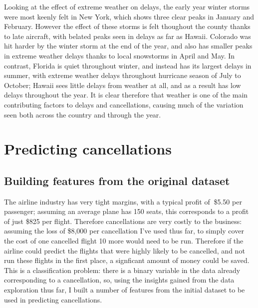 \documentclass[a4paper]{article}
\begin{document}
Looking at the effect of extreme weather on delays, the early year winter storms were most keenly felt in New York, which shows three clear peaks in January and February. However the effect of these storms is felt thoughout the county thanks to late aircraft, with belated peaks seen in delays as far as Hawaii. Colorado was hit harder by the winter storm at the end of the year, and also has smaller peaks in extreme weather delays thanks to local snowstorms in April\footnotemark[13] and May\footnotemark[14]. In contrast, Florida is quiet throughout winter, and instead has its largest delays in summer, with extreme weather delays throughout hurricane season of July to October; Hawaii sees little delays from weather at all, and as a result has low delays throughout the year. It is clear therefore that weather is one of the main contributing factors to delays and cancellations, causing much of the variation seen both across the country and through the year.

\section*{Predicting cancellations}

\subsection*{Building features from the original dataset}

The airline industry has very tight margins, with a typical profit of $~$\$5.50 per passenger;\footnotemark[15] assuming an average plane has 150 seats, this corresponds to a profit of just \$825 per flight. Therefore cancellations are very costly to the business: assuming the loss of \$8,000 per cancellation I've used thus far, to simply cover the cost of one cancelled flight 10 more would need to be run. Therefore if the airline could predict the flights that were highly likely to be cancelled, and not run these flights in the first place, a signficant amount of money could be saved. This is a classification problem: there is a binary variable in the data already corresponding to a cancellation, so, using the insights gained from the data exploration thus far, I built a number of features from the initial dataset to be used in predicting cancellations.
\end{document}
